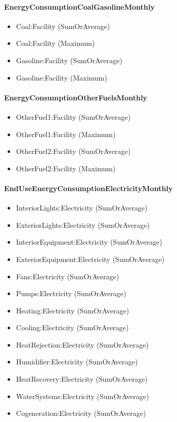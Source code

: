\paragraph{EnergyConsumptionCoalGasolineMonthly}\label{energyconsumptioncoalgasolinemonthly}

\begin{itemize}
\item
  Coal:Facility (SumOrAverage)
\item
  Coal:Facility (Maximum)
\item
  Gasoline:Facility (SumOrAverage)
\item
  Gasoline:Facility (Maximum)
\end{itemize}

\paragraph{EnergyConsumptionOtherFuelsMonthly}\label{energyconsumptionotherfuelsmonthly}

\begin{itemize}
\item
  OtherFuel1:Facility (SumOrAverage)
\item
  OtherFuel1:Facility (Maximum)
\item
  OtherFuel2:Facility (SumOrAverage)
\item
  OtherFuel2:Facility (Maximum)
\end{itemize}

\paragraph{EndUseEnergyConsumptionElectricityMonthly}\label{enduseenergyconsumptionelectricitymonthly}

\begin{itemize}
\item
  InteriorLights:Electricity (SumOrAverage)
\item
  ExteriorLights:Electricity (SumOrAverage)
\item
  InteriorEquipment:Electricity (SumOrAverage)
\item
  ExteriorEquipment:Electricity (SumOrAverage)
\item
  Fans:Electricity (SumOrAverage)
\item
  Pumps:Electricity (SumOrAverage)
\item
  Heating:Electricity (SumOrAverage)
\item
  Cooling:Electricity (SumOrAverage)
\item
  HeatRejection:Electricity (SumOrAverage)
\item
  Humidifier:Electricity (SumOrAverage)
\item
  HeatRecovery:Electricity (SumOrAverage)
\item
  WaterSystems:Electricity (SumOrAverage)
\item
  Cogeneration:Electricity (SumOrAverage)
\end{itemize}

